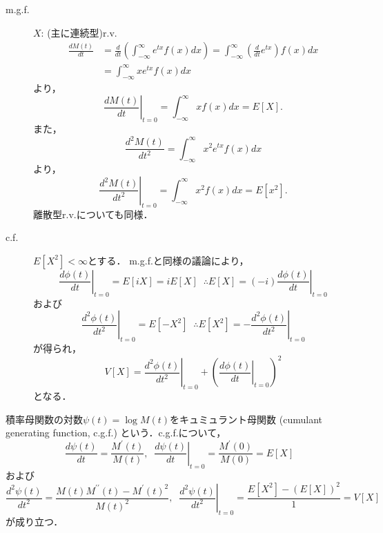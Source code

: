 \documentclass{jsreport}
\begin{document}
\begin{description}
  \item[m.g.f.]
  $X$: (主に連続型)r.v.
  \begin{align}
    \frac{d M(t)}{dt} &= \frac{d}{dt} \left( \int_{-\infty}^{\infty} e^{tx} f(x) dx\right)
    = \int_{-\infty}^{\infty} \left(\frac{d}{dt} e^{tx}\right) f(x) dx \nonumber \\
    &= \int_{-\infty}^{\infty} x e^{tx} f(x) dx \nonumber
  \end{align}
  より，
  \begin{equation}
    \left.\frac{d M(t)}{dt}\right|_{t = 0} = \int_{-\infty}^{\infty} xf(x) dx = E[X]. \nonumber
  \end{equation}
  また，
  \begin{equation}
    \frac{d^2 M(t)}{dt^2} = \int_{-\infty}^{\infty} x^2 e^{tx} f(x) dx \nonumber
  \end{equation}
  より，
  \begin{equation}
    \left.\frac{d^2 M(t)}{dt^2}\right|_{t = 0} = \int_{-\infty}^{\infty} x^2 f(x) dx = E[x^2]. \nonumber
  \end{equation}
  離散型r.v.についても同様．
  \item[c.f.]
  $E[X^2] < \infty$とする．
  m.g.f.と同様の議論により，
  \begin{equation}
    \left.\frac{d \phi(t)}{dt}\right|_{t = 0} = E[iX] = i E[X] \; \; \therefore E[X] = (-i) \left.\frac{d \phi(t)}{dt}\right|_{t = 0} \nonumber
  \end{equation}
  および
  \begin{equation}
    \left.\frac{d^2 \phi(t)}{dt^2}\right|_{t = 0} = E[-X^2] \; \; \therefore E[X^2] = - \left.\frac{d^2 \phi(t)}{dt^2}\right|_{t = 0} \nonumber
  \end{equation}
  が得られ，
  \begin{equation}
    V[X] = \left.\frac{d^2 \phi(t)}{dt^2}\right|_{t = 0} + \left(\left.\frac{d \phi(t)}{dt}\right|_{t = 0}\right)^2 \nonumber
  \end{equation}
  となる．
\end{description}

積率母関数の対数$\psi(t) = \log M(t)$をキュミュラント母関数 (cumulant generating function, c.g.f.) という．c.g.f.について，
\begin{equation}
  \frac{d \psi(t)}{dt} = \frac{M^{\prime}(t)}{M(t)}, \; \; \left.\frac{d \psi(t)}{dt}\right|_{t = 0} = \frac{M^{\prime}(0)}{M(0)}  = E[X] \nonumber
\end{equation}
および
\begin{equation}
  \frac{d^2 \psi(t)}{dt^2} = \frac{M(t) M^{\prime \prime}(t) - M^{\prime}(t)^2}{M(t)^2}, \; \; \left.\frac{d^2 \psi(t)}{dt^2}\right|_{t = 0} = \frac{E[X^2] - (E[X])^2}{1} = V[X] \nonumber
\end{equation}
が成り立つ．
\end{document}
